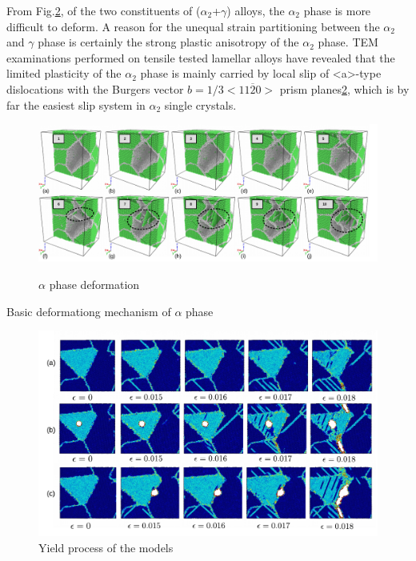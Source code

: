 \documentclass[journal,article,submit,moreauthors,pdftex,10pt,a4paper]{Definitions/mdpi}
\begin{document}
From Fig.\ref{fig:yield}, of the two constituents of ($\alpha_2$+$\gamma$) alloys, the $\alpha_2$ phase is more difficult to deform. A reason for the unequal strain partitioning between the $\alpha_2$ and $\gamma$ phase is certainly the strong plastic anisotropy of the $\alpha_2$ phase. TEM examinations performed on tensile  tested lamellar alloys have revealed that the limited plasticity of the $\alpha_2$ phase is mainly carried by local slip of <a>-type dislocations with the Burgers vector $b=1/3<11\overline{2}0>$ prism planes\ref{fig:yield}, which is by far the easiest slip system in $\alpha_2$ single crystals. 
	\begin{figure}[ht]
		\centering
		\includegraphics[width=1\linewidth]{img/def-alpha}
		\label{fig:def-alpha}
		\caption{$\alpha$ phase deformation}
	\end{figure}
Basic deformationg mechanism of $\alpha$ phase 
	
	\begin{figure}[ht]
		\centering
		\includegraphics[width=1\linewidth]{"img/fracture3"}
		\caption{Yield process of the models}
		\label{fig:yield}
	\end{figure}
	
\end{document}
